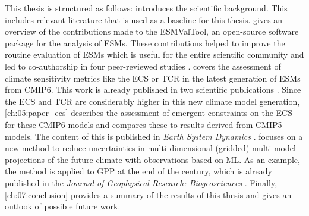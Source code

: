 This thesis is structured as follows: 
introduces the scientific background. This includes relevant literature that is
used as a baseline for this thesis.  gives an overview
of the contributions made to the \ac{ESMValTool}, an open-source software
package for the analysis of \acp{ESM}. These contributions helped to improve
the routine evaluation of \acp{ESM} which is useful for the entire scientific
community and led to co-authorship in four peer-reviewed studies
\autocite{Eyring2020, Lauer2020, Righi2020, Weigel2020}.
 covers the assessment of climate
sensitivity metrics like the \ac{ECS} or \ac{TCR} in the latest generation of
\acp{ESM} from \acs{CMIP}6. This work is already published in two scientific
publications \autocite{Bock2020, Meehl2020}. Since the \ac{ECS} and \ac{TCR}
are considerably higher in this new climate model generation,
\cref{ch:05:paper_ecs} describes the assessment of emergent constraints on the
\ac{ECS} for these \acs{CMIP}6 models and compares these to results derived
from \acs{CMIP}5 models. The content of this  is
published in \emph{Earth System Dynamics} \autocite{Schlund2020a}.
 focuses on a new method to reduce uncertainties in
multi-dimensional (gridded) multi-model projections of the future climate with
observations based on \ac{ML}. As an example, the method is applied to \ac{GPP}
at the end of the  century, which is already published in the
\emph{Journal of Geophysical Research: Biogeosciences} \autocite{Schlund2020}.
Finally, \cref{ch:07:conclusion} provides a summary of the results of this
thesis and gives an outlook of possible future work.
